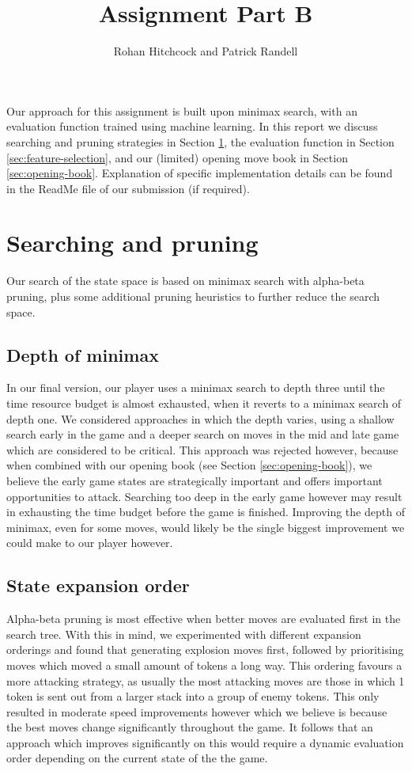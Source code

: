 \documentclass[11pt]{article}
\begin{document}
\title{\textbf{Assignment Part B}}
\author{Rohan Hitchcock and Patrick Randell}
\date{}
\maketitle


Our approach for this assignment is built upon minimax search, with an evaluation function trained using machine learning. In this report we discuss searching and pruning strategies in Section \ref{sec:search}, the evaluation function in Section \ref{sec:feature-selection}, and our (limited) opening move book in Section \ref{sec:opening-book}. Explanation of specific implementation details can be found in the ReadMe file of our submission (if required).

\section{Searching and pruning} \label{sec:search}
Our search of the state space is based on minimax search with alpha-beta pruning, plus some additional pruning heuristics to further reduce the search space. 

\subsection{Depth of minimax}
In our final version, our player uses a minimax search to depth three until the time resource budget is almost exhausted, when it reverts to a minimax search of depth one. We considered approaches in which the depth varies, using a shallow search early in the game and a deeper search on moves in the mid and late game which are considered to be critical. This approach was rejected however, because when combined with our opening book (see Section \ref{sec:opening-book}), we believe the early game states are strategically important and offers important opportunities to attack. Searching too deep in the early game however may result in exhausting the time budget before the game is finished. Improving the depth of minimax, even for some moves, would likely be the single biggest improvement we could make to our player however.

\subsection{State expansion order}
Alpha-beta pruning is most effective when better moves are evaluated first in the search tree. With this in mind, we experimented with different expansion orderings and found that generating explosion moves first, followed by prioritising moves which moved a small amount of tokens a long way. This ordering favours a more attacking strategy, as usually the most attacking moves are those in which 1 token is sent out from a larger stack into a group of enemy tokens. This only resulted in moderate speed improvements however which we believe is because the best moves change significantly throughout the game. It follows that an approach which improves significantly on this would require a dynamic evaluation order depending on the current state of the the game. 
\end{document}
